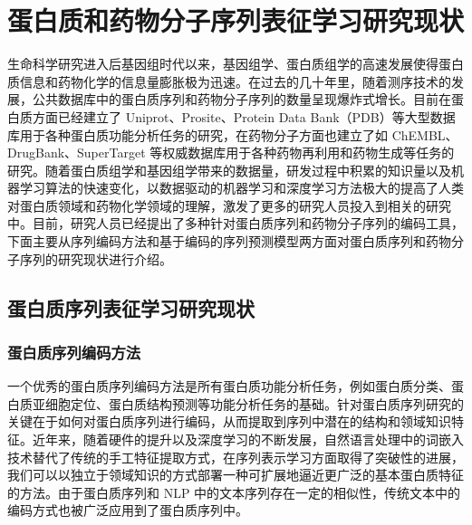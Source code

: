 
\chapter{蛋白质和药物分子序列表征学习研究现状}

生命科学研究进入后基因组时代以来，基因组学、蛋白质组学的高速发展使得蛋白质信息和药物化学的信息量膨胀极为迅速。在过去的几十年里，随着测序技术的发展，公共数据库中的蛋白质序列和药物分子序列的数量呈现爆炸式增长。目前在蛋白质方面已经建立了 Uniprot、Prosite、Protein Data Bank（PDB）等大型数据库用于各种蛋白质功能分析任务的研究，在药物分子方面也建立了如 ChEMBL、DrugBank、SuperTarget 等权威数据库用于各种药物再利用和药物生成等任务的研究。随着蛋白质组学和基因组学带来的数据量，研发过程中积累的知识量以及机器学习算法的快速变化，以数据驱动的机器学习和深度学习方法极大的提高了人类对蛋白质领域和药物化学领域的理解，激发了更多的研究人员投入到相关的研究中。目前，研究人员已经提出了多种针对蛋白质序列和药物分子序列的编码工具，下面主要从序列编码方法和基于编码的序列预测模型两方面对蛋白质序列和药物分子序列的研究现状进行介绍。

\section{蛋白质序列表征学习研究现状}

\subsection{蛋白质序列编码方法}
一个优秀的蛋白质序列编码方法是所有蛋白质功能分析任务，例如蛋白质分类、蛋白质亚细胞定位、蛋白质结构预测等功能分析任务的基础。针对蛋白质序列研究的关键在于如何对蛋白质序列进行编码，从而提取到序列中潜在的结构和领域知识特征。近年来，随着硬件的提升以及深度学习的不断发展，自然语言处理中的词嵌入技术替代了传统的手工特征提取方式，在序列表示学习方面取得了突破性的进展，我们可以以独立于领域知识的方式部署一种可扩展地逼近更广泛的基本蛋白质特征的方法。由于蛋白质序列和 NLP 中的文本序列存在一定的相似性，传统文本中的编码方式也被广泛应用到了蛋白质序列中。

